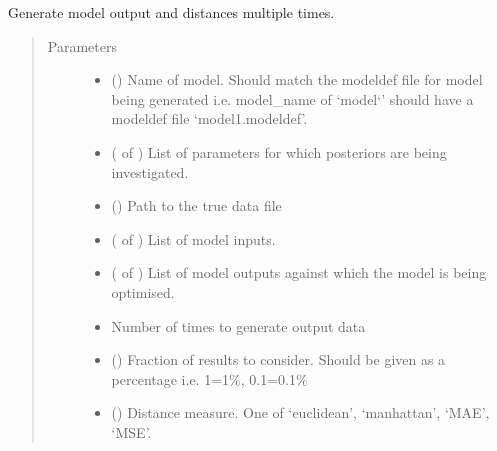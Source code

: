 \documentclass[letterpaper,10pt,english]{sphinxmanual}
\begin{document}
\begin{fulllineitems}
\label{\detokenize{misc:bayescmd.results_handling.plot_repeated_outputs}}
Generate model output and distances multiple times.
\begin{quote}\begin{description}
\item[{Parameters}] \leavevmode\begin{itemize}
\item {} 
 () \textendash{} Name of model. Should match the modeldef file for model being generated
i.e. model\_name of ‘model{}`’ should have a modeldef file
‘model1.modeldef’.

\item {} 
 ( of ) \textendash{} List of parameters for which posteriors are being investigated.

\item {} 
 () \textendash{} Path to the true data file

\item {} 
 ( of ) \textendash{} List of model inputs.

\item {} 
 ( of ) \textendash{} List of model outputs against which the model is being optimised.

\item {} 
 \textendash{} Number of times to generate output data

\item {} 
 () \textendash{} Fraction of results to consider. Should be given as a percentage i.e.
1=1\%, 0.1=0.1\%

\item {} 
 () \textendash{} Distance measure. One of ‘euclidean’, ‘manhattan’, ‘MAE’, ‘MSE’.


\end{itemize}
\end{description}
\end{quote}
\end{fulllineitems}
\end{document}
